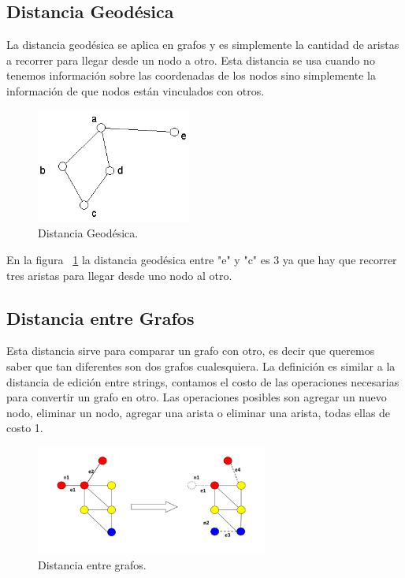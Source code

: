 \subsection{Distancia Geodésica}

La distancia geodésica se aplica en grafos y es simplemente la cantidad de aristas a recorrer para llegar desde un nodo a otro. Esta distancia se usa cuando no tenemos información sobre las coordenadas de los nodos sino simplemente la información de que nodos están vinculados con otros. 

\begin{figure}[!htb]
\centering
\includegraphics[width=2in]{figures/geodesic-fig.png}

\caption{Distancia Geodésica.}
\label{fig:geodesica}
\end{figure}

En la figura ~\ref{fig:geodesica}  la distancia geodésica entre "e" y "c" es 3 ya que hay que recorrer tres aristas para llegar desde uno nodo al otro.

\subsection{Distancia entre Grafos}

Esta distancia sirve para comparar un grafo con otro, es decir que queremos saber que tan diferentes son dos grafos cualesquiera. La definición es similar a la distancia de edición entre strings, contamos el costo de las operaciones necesarias para convertir un grafo en otro. Las operaciones posibles son agregar un nuevo nodo, eliminar un nodo, agregar una arista o eliminar una arista, todas ellas de costo 1. 

\begin{figure}[!htb]
\centering
\includegraphics[width=3in]{figures/graph-distance-fig.png}

\caption{Distancia entre grafos.}
\label{fig:graphdistance}
\end{figure}

